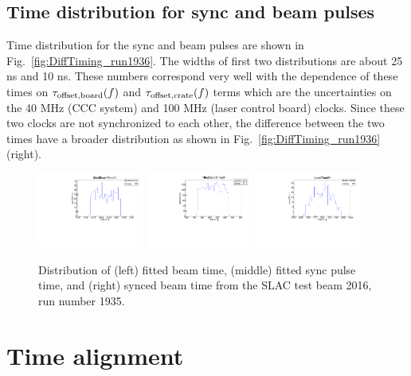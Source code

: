 \subsection{Time distribution for sync and beam pulses}

Time distribution for the sync and beam pulses are shown in Fig.~\ref{fig:DiffTiming_run1936}.
The widths of first two distributions are about 25 ns and 10 ns. These numbers correspond very well with the dependence of these times on $\tau_{\rm{offset,board}}(f)$ and $\tau_{\rm{offset,crate}}(f)$ terms which are the uncertainties on the 40 MHz (CCC system) and 100 MHz (laser control board) clocks. Since these two clocks are not synchronized to each other, the difference between the two times have a broader distribution as shown in Fig.~\ref{fig:DiffTiming_run1936}(right).

\begin{figure}[htbp]
\centering
\includegraphics[width=0.31\textwidth]{pics/fittedBeamTime24_run1935.pdf} \includegraphics[width=0.31\textwidth]{pics/fittedSyncTime24.pdf} 
\includegraphics[width=0.31\textwidth]{pics/beamTime24_run1935.pdf} 
\caption{Distribution of (left) fitted beam time, (middle) fitted sync pulse time, and (right) synced beam time from the SLAC test beam 2016, run number 1935.}\label{fig:Timing_run1935}
\end{figure}

\section{Time alignment}

